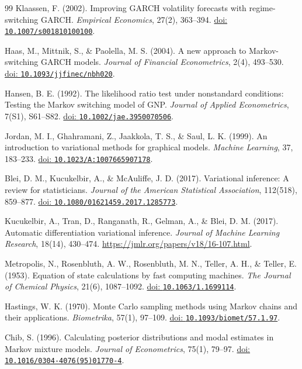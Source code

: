 \documentclass[12pt,a4paper]{article}
\numberwithin{equation}{section}
\begin{document}
\begin{thebibliography}{99}
Klaassen, F. (2002).
Improving GARCH volatility forecasts with regime-switching GARCH.
\textit{Empirical Economics}, 27(2), 363--394.
\href{https://doi.org/10.1007/s001810100100}{doi: \nolinkurl{10.1007/s001810100100}}.

Haas, M., Mittnik, S., \& Paolella, M. S. (2004).
A new approach to Markov-switching GARCH models.
\textit{Journal of Financial Econometrics}, 2(4), 493--530.
\href{https://doi.org/10.1093/jjfinec/nbh020}{doi: \nolinkurl{10.1093/jjfinec/nbh020}}.

Hansen, B. E. (1992).
The likelihood ratio test under nonstandard conditions: Testing the Markov switching model of GNP.
\textit{Journal of Applied Econometrics}, 7(S1), S61--S82.
\href{https://doi.org/10.1002/jae.3950070506}{doi: \nolinkurl{10.1002/jae.3950070506}}.

Jordan, M. I., Ghahramani, Z., Jaakkola, T. S., \& Saul, L. K. (1999).
An introduction to variational methods for graphical models.
\textit{Machine Learning}, 37, 183--233.
\href{https://doi.org/10.1023/A:1007665907178}{doi: \nolinkurl{10.1023/A:1007665907178}}.

Blei, D. M., Kucukelbir, A., \& McAuliffe, J. D. (2017).
Variational inference: A review for statisticians.
\textit{Journal of the American Statistical Association}, 112(518), 859--877.
\href{https://doi.org/10.1080/01621459.2017.1285773}{doi: \nolinkurl{10.1080/01621459.2017.1285773}}.

Kucukelbir, A., Tran, D., Ranganath, R., Gelman, A., \& Blei, D. M. (2017).
Automatic differentiation variational inference.
\textit{Journal of Machine Learning Research}, 18(14), 430--474.
\url{https://jmlr.org/papers/v18/16-107.html}.

Metropolis, N., Rosenbluth, A. W., Rosenbluth, M. N., Teller, A. H., \& Teller, E. (1953).
Equation of state calculations by fast computing machines.
\textit{The Journal of Chemical Physics}, 21(6), 1087--1092.
\href{https://doi.org/10.1063/1.1699114}{doi: \nolinkurl{10.1063/1.1699114}}.

Hastings, W. K. (1970).
Monte Carlo sampling methods using Markov chains and their applications.
\textit{Biometrika}, 57(1), 97--109.
\href{https://doi.org/10.1093/biomet/57.1.97}{doi: \nolinkurl{10.1093/biomet/57.1.97}}.

Chib, S. (1996).
Calculating posterior distributions and modal estimates in Markov mixture models.
\textit{Journal of Econometrics}, 75(1), 79--97.
\href{https://doi.org/10.1016/0304-4076(95)01770-4}{doi: \nolinkurl{10.1016/0304-4076(95)01770-4}}.


\end{thebibliography}
\end{document}
